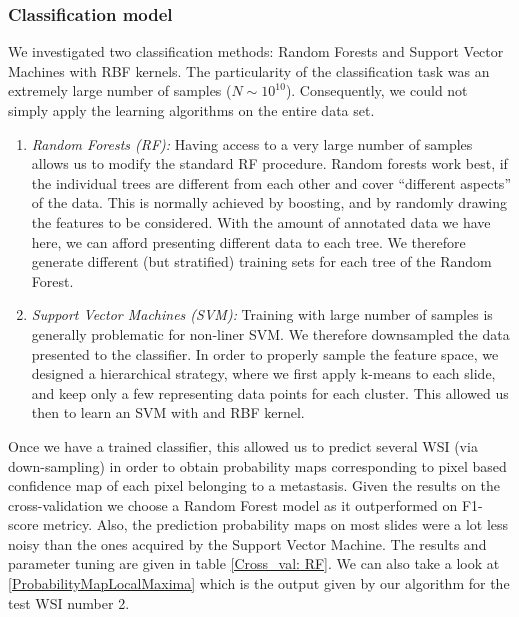 \documentclass[a4paper,10pt]{article}
\begin{document}
%
%
\subsubsection*{Classification model}
We investigated two classification methods: Random Forests and Support
Vector Machines with RBF kernels. The particularity of the
classification task was an extremely large number of samples ($N \sim  10^{10}$).
Consequently, we could not simply apply the learning algorithms on the
entire data set.  
\begin{enumerate}
\item {\it Random Forests (RF):} Having access to a very large number of
  samples allows us to modify the standard RF procedure. Random
  forests work best, if the individual trees are different from each
  other and cover ``different aspects'' of the data. This is normally
  achieved by boosting, and by randomly drawing the features to be
  considered. With the amount of annotated data we have here, we can
  afford presenting different data to each tree. We therefore generate
  different (but stratified) training sets for each tree of the Random
  Forest.  
\item {\it Support Vector Machines (SVM):} Training with large number
  of samples is generally problematic for non-liner SVM. We therefore
  downsampled the data presented to the classifier. In order to
  properly sample the feature space, we designed a hierarchical
  strategy, where we first apply k-means to each slide, and keep only
  a few representing data points for each cluster. This allowed us
  then to learn an SVM with and RBF kernel. 
\end{enumerate}

Once we have a trained classifier, this allowed us to predict several WSI (via down-sampling) in order to obtain probability maps corresponding to pixel based confidence map of each pixel belonging to a metastasis. Given the results on the cross-validation we choose a Random Forest model as it outperformed on F1-score metricy. Also, the prediction probability maps on most slides were a lot less noisy than the ones acquired by the Support Vector Machine. The results and parameter tuning are given in table \ref{Cross_val: RF}. We can also take a look at \ref{ProbabilityMapLocalMaxima} which is the output given by our algorithm for the test WSI number 2.
\end{document}
